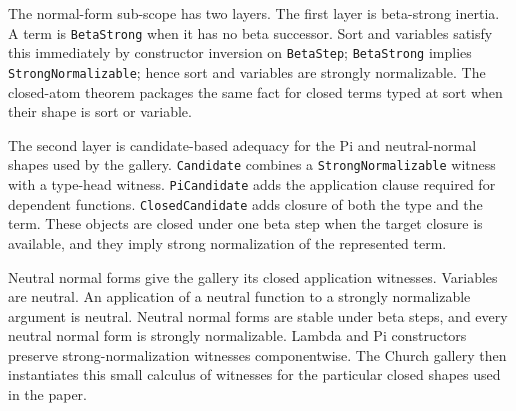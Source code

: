 The normal-form sub-scope has two layers.  The first layer is beta-strong
inertia.  A term is \texttt{BetaStrong} when it has no beta successor.  Sort
and variables satisfy this immediately by constructor inversion on
\texttt{BetaStep}; \texttt{BetaStrong} implies
\texttt{StrongNormalizable}; hence sort and variables are strongly
normalizable.  The closed-atom theorem packages the same fact for closed
terms typed at sort when their shape is sort or variable.


The second layer is candidate-based adequacy for the Pi and neutral-normal
shapes used by the gallery.  \texttt{Candidate} combines a
\texttt{StrongNormalizable} witness with a type-head witness.
\texttt{PiCandidate} adds the application clause required for dependent
functions.  \texttt{ClosedCandidate} adds closure of both the type and the
term.  These objects are closed under one beta step when the target closure is
available, and they imply strong normalization of the represented term.


Neutral normal forms give the gallery its closed application witnesses.
Variables are neutral.  An application of a neutral function to a strongly
normalizable argument is neutral.  Neutral normal forms are stable under beta
steps, and every neutral normal form is strongly normalizable.  Lambda and Pi
constructors preserve strong-normalization witnesses componentwise.  The
Church gallery then instantiates this small calculus of witnesses for the
particular closed shapes used in the paper.


